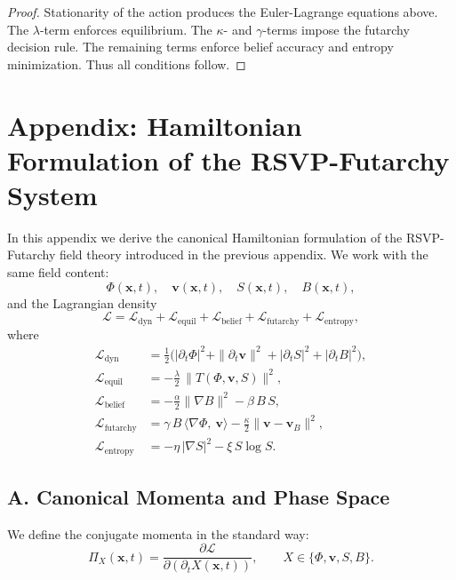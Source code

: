 \documentclass[12pt]{article}
\begin{document}
\begin{proof}
Stationarity of the action produces the Euler-Lagrange equations above.
The $\lambda$-term enforces equilibrium. The $\kappa$- and $\gamma$-terms
impose the futarchy decision rule. The remaining terms enforce belief
accuracy and entropy minimization. Thus all conditions follow.
\end{proof}


\section*{Appendix: Hamiltonian Formulation of the RSVP-Futarchy System}

In this appendix we derive the canonical Hamiltonian formulation of
the RSVP-Futarchy field theory introduced in the previous appendix.
We work with the same field content:
\[
\Phi(\mathbf{x},t),\quad
\mathbf{v}(\mathbf{x},t),\quad
S(\mathbf{x},t),\quad
B(\mathbf{x},t),
\]
and the Lagrangian density
\[
\mathcal{L}
=
\mathcal{L}_{\text{dyn}}
+
\mathcal{L}_{\text{equil}}
+
\mathcal{L}_{\text{belief}}
+
\mathcal{L}_{\text{futarchy}}
+
\mathcal{L}_{\text{entropy}},
\]
where
\begin{align}
\mathcal{L}_{\text{dyn}}
&=
\frac{1}{2}\Big(
    |\partial_t \Phi|^2
  + \|\partial_t \mathbf{v}\|^2
  + |\partial_t S|^2
  + |\partial_t B|^2
\Big), \\[4pt]
\mathcal{L}_{\text{equil}}
&=
- \frac{\lambda}{2}\,
    \|T(\Phi, \mathbf{v}, S)\|^2, \\[4pt]
\mathcal{L}_{\text{belief}}
&=
- \frac{\alpha}{2}
    \|\nabla B\|^2
    - \beta\, B\, S, \\[4pt]
\mathcal{L}_{\text{futarchy}}
&=
\gamma\, B\,\langle \nabla \Phi,\ \mathbf{v} \rangle
    - \frac{\kappa}{2}\| \mathbf{v} - \mathbf{v}_B \|^2, \\[4pt]
\mathcal{L}_{\text{entropy}}
&=
- \eta\, |\nabla S|^2 
- \xi\, S \log S.
\end{align}

\subsection*{A. Canonical Momenta and Phase Space}

We define the conjugate momenta in the standard way:
\[
\Pi_X(\mathbf{x},t)
=
\frac{\partial \mathcal{L}}{\partial (\partial_t X(\mathbf{x},t))},
\qquad
X \in \{\Phi,\mathbf{v},S,B\}.
\]
\end{document}

